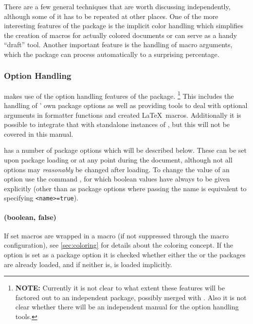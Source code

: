 \documentclass{scrartcl}
\begin{document}
There are a few general techniques that are worth discussing independently,
although some of it has to be repeated at other places.  One of the more
interesting features of the  package is the implicit color
handling which simplifies the creation of macros for actually colored documents
or can serve as a handy “draft” tool.  Another important feature is the handling
of macro arguments, which the package can process automatically to a surprising
percentage.

\subsubsection{Option Handling}
\label{sec:option-handling}

 makes use of the option handling features of the
 package.%
\footnote{\textbf{NOTE:} Currently it is not clear to what extent these features will
be factored out to an independent package, possibly merged with .
Also it is not clear whether there will be an independent manual for the option handling
tools.} %
This includes the handling of ' own package options as
well as providing tools to deal with optional arguments in formatter functions
and created \LaTeX\ macros.  Additionally it is possible to integrate that with
standalone instances of , but this will not be covered in
this manual.

 has a number of package options which will be described
below.  These can be set upon package loading or at any point during the
document, although not all options may \emph{reasonably} be changed after
loading.  To change the value of an option use the command
, for which boolean values have
always to be given explicitly (other than as package options where passing the
name is equivalent to specifying \texttt{<name>=true}).


\paragraph{ (boolean, false)}

If set macros are wrapped in a  macro (if not suppressed through
the macro configuration),  see \vref{sec:coloring} for details about the
coloring concept.  If the option is set as a package option it is checked
whether either the  or the  packages are already
loaded, and if neither is,  is loaded implicitly.
\end{document}

